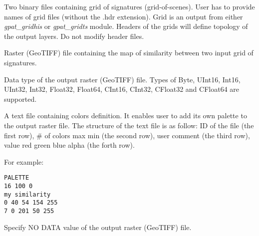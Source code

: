 
Two binary files containing grid of signatures (grid-of-scenes). 
User has to provide names of grid files (without the .hdr extension). 
Grid is an output from either {\it gpat\_gridhis} or {\it gpat\_gridts} module. 
Headers of the grids will define topology of the output layers. 
Do not modify header files.


Raster (GeoTIFF) file containing the map of similarity between two input grid of signatures. 


Data type of the output raster (GeoTIFF) file. Types of Byte, UInt16, Int16, UInt32, Int32, Float32, Float64, CInt16, CInt32, CFloat32 and CFloat64 are supported.


A text file containing colors definition. 
It enables user to add its own palette to the output raster file.
The structure of the text file is as follow:
ID of the file (the first row), \# of colors max min (the second row), user comment (the third row), value red green blue alpha (the forth row). 

For example: \\
\begin{minipage}{\linewidth}
\begin{lstlisting}
PALETTE
16 100 0
my similarity
0 40 54 154 255
7 0 201 50 255
\end{lstlisting}
\end{minipage}


Specify NO DATA value of the output raster (GeoTIFF) file.


